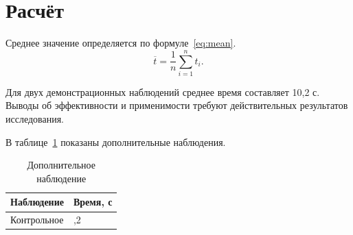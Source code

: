 \documentclass[14pt,a4paper,oneside]{extreport}
\begin{document}
\section{Расчёт}
Среднее значение определяется по формуле~\eqref{eq:mean}.
\begin{equation}\label{eq:mean}
\overline{t}=\frac{1}{n}\sum_{i=1}^{n}t_i.
\end{equation}


Для двух демонстрационных наблюдений среднее время составляет 10,2 с. Выводы об эффективности и применимости требуют действительных результатов исследования.

\begin{GostSources}
\end{GostSources}

В таблице~\ref{tab:extra} показаны дополнительные наблюдения.
\begin{table}[!htbp]
\caption{Дополнительное наблюдение}\label{tab:extra}
\centering
\begin{tabular}{|p{60mm}|>{\centering\arraybackslash}p{60mm}|}
\hline
Наблюдение & Время, с\\\hline
Контрольное & 10,2\\\hline
\end{tabular}
\end{table}
\end{document}
